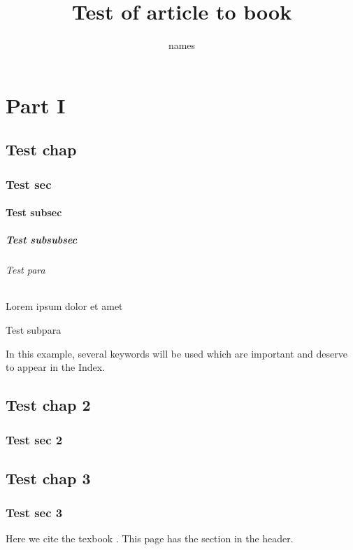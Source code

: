 \documentclass{article}
\title{Test of article to book}
\author{names}
\begin{document}
    \frontmatter
    \maketitle
    \tableofcontents
    \listoffigures
    \listoftables
    
    \part{Part I}
    \chapter{Test chap}
    \section{Test sec}
    \subsection{Test subsec}
    \subsubsection{Test subsubsec}
    \paragraph{Test para} Lorem ipsum dolor et amet
    \subparagraph{Test subpara}
    In this example, several keywords will be used 
    which are important and deserve to appear in the Index.
    
    \chapter{Test chap 2}
    \section{Test sec 2}

    \mainmatter
    \chapter{Test chap 3}
    \section{Test sec 3}
    \clearpage
    Here we cite the texbook \cite{texbook}.
    \clearpage
    This page has the section in the header.
    
\end{document}
